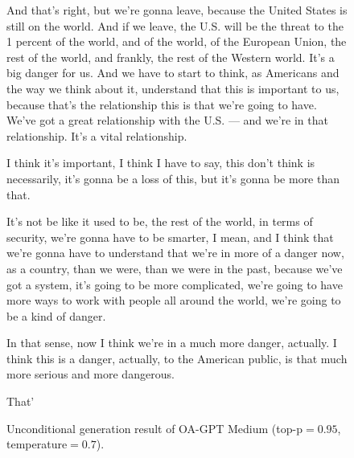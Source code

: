 \begin{figure}[htbp]
\begin{minipage}{\textwidth}
{And that’s right, but we’re gonna leave, because the United States is still on the world. And if we leave, the U.S. will be the threat to the 1 percent of the world, and of the world, of the European Union, the rest of the world, and frankly, the rest of the Western world. It’s a big danger for us. And we have to start to think, as Americans and the way we think about it, understand that this is important to us, because that’s the relationship this is that we’re going to have. We’ve got a great relationship with the U.S. — and we’re in that relationship. It’s a vital relationship.

I think it’s important, I think I have to say, this don’t think is necessarily, it’s gonna be a loss of this, but it’s gonna be more than that.

It’s not be like it used to be, the rest of the world, in terms of security, we’re gonna have to be smarter, I mean, and I think that we’re gonna have to understand that we’re in more of a danger now, as a country, than we were, than we were in the past, because we’ve got a system, it’s going to be more complicated, we’re going to have more ways to work with people all around the world, we’re going to be a kind of danger.

In that sense, now I think we’re in a much more danger, actually. I think this is a danger, actually, to the American public, is that much more serious and more dangerous.

That’
}
  \end{minipage}
\caption{Unconditional generation result of OA-GPT Medium (top-p$=0.95$, temperature$=0.7$).}
\label{fig:text0.950.7}
\vspace{50mm}
\end{figure}




\newpage